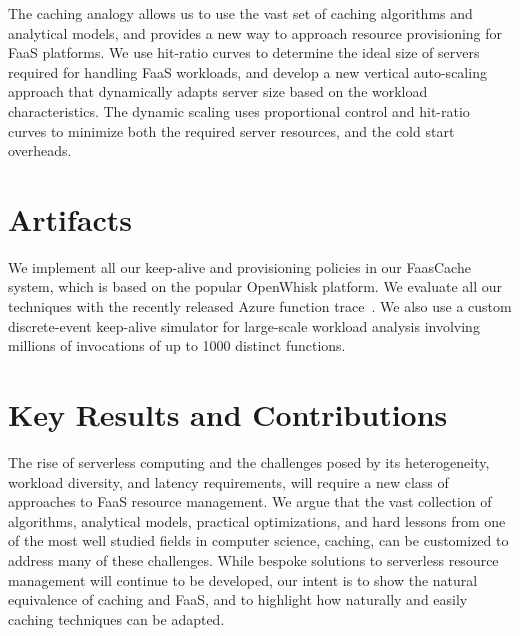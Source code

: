 \documentclass[pageno]{jpaper}
\begin{document}
The caching analogy allows us to use the vast set of caching algorithms and  analytical models, and provides a new way to approach resource provisioning for FaaS platforms.
We use hit-ratio curves to determine the ideal size of servers required for handling FaaS workloads, and develop a new vertical auto-scaling approach that dynamically adapts server size based on the workload characteristics.
The dynamic scaling uses proportional control and hit-ratio curves to minimize both the required server resources, and the cold start overheads. 


\section{Artifacts}
\vspace*{\subsecspace}

We implement all our keep-alive and provisioning policies in our FaasCache system, which is based on the popular OpenWhisk platform. 
We evaluate all our techniques with the recently released Azure function trace~\cite{shahrad_serverless_2020}. 
We also use a custom discrete-event keep-alive simulator for large-scale workload analysis involving millions of invocations of up to 1000 distinct functions. 

%


\section{Key Results and Contributions}
\vspace*{\subsecspace}

The rise of serverless computing and the challenges posed by its heterogeneity, workload diversity, and latency requirements, will require a new class of approaches to FaaS resource management. 
We argue that the vast collection of algorithms, analytical models, practical optimizations, and hard lessons from one of the most well studied fields in computer science, caching, can be customized to address many of these challenges. 
While bespoke solutions to serverless resource management will continue to be developed, our intent is to show the natural equivalence of caching and FaaS, and to highlight how naturally and easily caching techniques can be adapted. 
\end{document}
